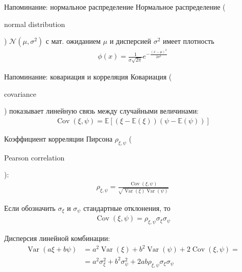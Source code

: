 \documentclass{beamer}
\newcommand{\en}[1]{\begin{otherlanguage}{english}#1\end{otherlanguage}}
\begin{document}
\begin{frame}{Напоминание: нормальное распределение}
\justify
\alert{Нормальное распределение} (\en{normal distribution}) $\mathcal{N}(\mu, \sigma^2)$ с мат. ожиданием $\mu$ и дисперсией $\sigma^2$ имеет плотность
\begin{align*}
\phi(x) = \frac{1}{\sigma\sqrt{2\pi}}e^{-\frac{(x-\mu)^2}{2\sigma^2}}
\end{align*}

\justify
\centering
{}
\end{frame}



\begin{frame}{Напоминание: ковариация и корреляция}
\justify
\alert{Ковариация} (\en{covariance}) показывает линейную связь между случайными величинами:
\begin{align*}
\operatorname{Cov}(\xi, \psi) = \mathbb{E}[(\xi - \mathbb{E}(\xi))(\psi - \mathbb{E}(\psi))]
\end{align*}

\justify
\alert{Коэффициент корреляции Пирсона} $\rho_{\xi,\psi}$ (\en{Pearson correlation}):
\begin{align*}
\rho_{\xi, \psi} = \frac{\operatorname{Cov}(\xi, \psi)}{\sqrt{\operatorname{Var}(\xi)\operatorname{Var}(\psi)}}
\end{align*}

\justify
Если обозначить $\sigma_\xi$ и $\sigma_\psi$ стандартные отклонения, то
\begin{align*}
\operatorname{Cov}(\xi, \psi) = \rho_{\xi, \psi}\sigma_\xi\sigma_\psi
\end{align*}

Дисперсия линейной комбинации:
\begin{align*}
\operatorname{Var}(a\xi + b\psi) &= a^2\operatorname{Var}(\xi) + b^2\operatorname{Var}(\psi) + 2\operatorname{Cov}(\xi, \psi) = \\
&= a^2\sigma_\xi^2 + b^2\sigma_\psi^2 + 2ab\rho_{\xi,\psi}\sigma_{\xi}\sigma_{\psi}
\end{align*}
\end{frame}
\end{document}
